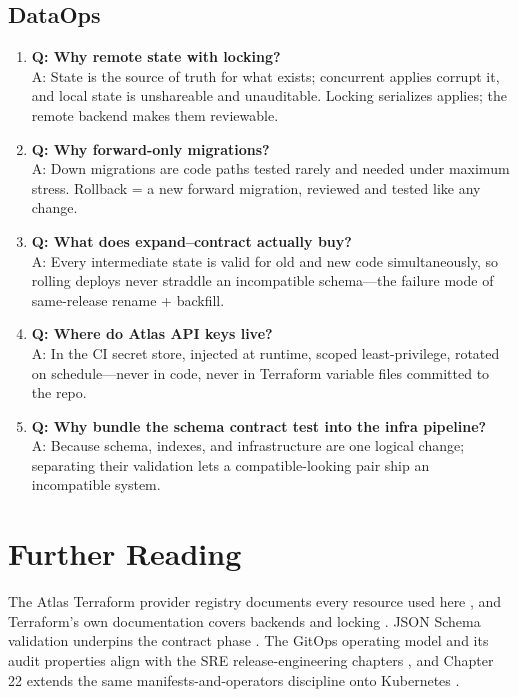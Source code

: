 \subsection{DataOps}
\begin{enumerate}
    \item \textbf{Q: Why remote state with locking?}\\
    A: State is the source of truth for what exists; concurrent applies corrupt it, and local state is unshareable and unauditable. Locking serializes applies; the remote backend makes them reviewable.

    \item \textbf{Q: Why forward-only migrations?}\\
    A: Down migrations are code paths tested rarely and needed under maximum stress. Rollback = a new forward migration, reviewed and tested like any change.

    \item \textbf{Q: What does expand--contract actually buy?}\\
    A: Every intermediate state is valid for old and new code simultaneously, so rolling deploys never straddle an incompatible schema---the failure mode of same-release rename + backfill.

    \item \textbf{Q: Where do Atlas API keys live?}\\
    A: In the CI secret store, injected at runtime, scoped least-privilege, rotated on schedule---never in code, never in Terraform variable files committed to the repo.

    \item \textbf{Q: Why bundle the schema contract test into the infra pipeline?}\\
    A: Because schema, indexes, and infrastructure are one logical change; separating their validation lets a compatible-looking pair ship an incompatible system.
\end{enumerate}

\section{Further Reading}
The Atlas Terraform provider registry documents every resource used here \cite{mongodbTerraformDocs}, and Terraform's own documentation covers backends and locking \cite{terraformDocs}. JSON Schema validation underpins the contract phase \cite{mongodbJsonSchemaDocs}. The GitOps operating model and its audit properties align with the SRE release-engineering chapters \cite{sreBook}, and Chapter 22 extends the same manifests-and-operators discipline onto Kubernetes \cite{mongodbK8sOperatorDocs}.

